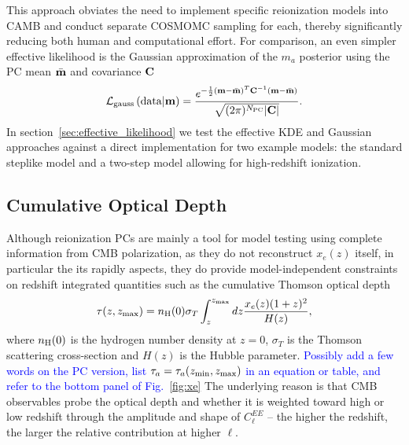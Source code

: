 \documentclass[prd,twocolumn,amsmath,amssymb,floatfix,superscriptaddress,nofootinbib]{revtex4-1}
\newcommand{\wh}[1]{\textcolor{blue}{#1}}
\begin{document}
This approach obviates the need to implement specific reionization models into CAMB and conduct separate COSMOMC sampling for each, thereby significantly reducing both human and computational effort.
For comparison, an even simpler effective likelihood is the Gaussian approximation of the $m_a$ posterior using the PC mean $\bar{\bf m}$ and covariance $\bf C$
%
\begin{equation}
 {\cal L}_{\rm gauss}\left({\rm data}|\mathbf{m} \right) = \frac{ e^{-\frac{1}{2} ({\bf m}-\bar{\bf m})^T {\bf C}^{-1} ({\bf m}-\bar{\bf m}) } }{\sqrt{(2\pi)^{N_{\rm PC}} | \mathbf{C}| }}.
 \label{eq:gaussian}
 \end{equation}
%
In section~\ref{sec:effective_likelihood} we test the effective KDE and Gaussian approaches against a direct implementation
for two example models: the standard steplike model and a two-step model allowing for high-redshift ionization.


%
%
%
 
\subsection{Cumulative Optical Depth}
\label{sec:cumulative}

Although reionization PCs are mainly a tool for model testing using complete information from CMB polarization, as they do not reconstruct $x_e(z)$ itself, in particular the its rapidly  aspects, they do provide model-independent constraints on redshift integrated quantities such as  the cumulative Thomson optical depth
\begin{equation}
\tau(z,z_{\rm max}) = n_{\rm H}(0) \sigma_T \int_z^{z_{\rm max}} dz \frac{x_e(z) (1+z)^{2} }{H(z)},
\label{eq:cumtau}
\end{equation}
where $n_{\rm H}(0)$ is the hydrogen number density at $z=0$, $\sigma_T$ is the Thomson scattering cross-section and $H(z)$ is the Hubble parameter.  
\wh{Possibly add a few words on the PC version, list $\tau_a = \tau_a(z_{\rm min},z_{\rm max})$ in an equation or table, and refer to the
bottom panel of Fig.~\ref{fig:xe}}
The underlying reason is that CMB observables probe the optical depth and whether it is weighted toward high or low redshift through the amplitude and shape of 
$C_\ell^{EE}$ -- the higher the redshift, the
larger the relative contribution at higher $\ell$.
\end{document}

